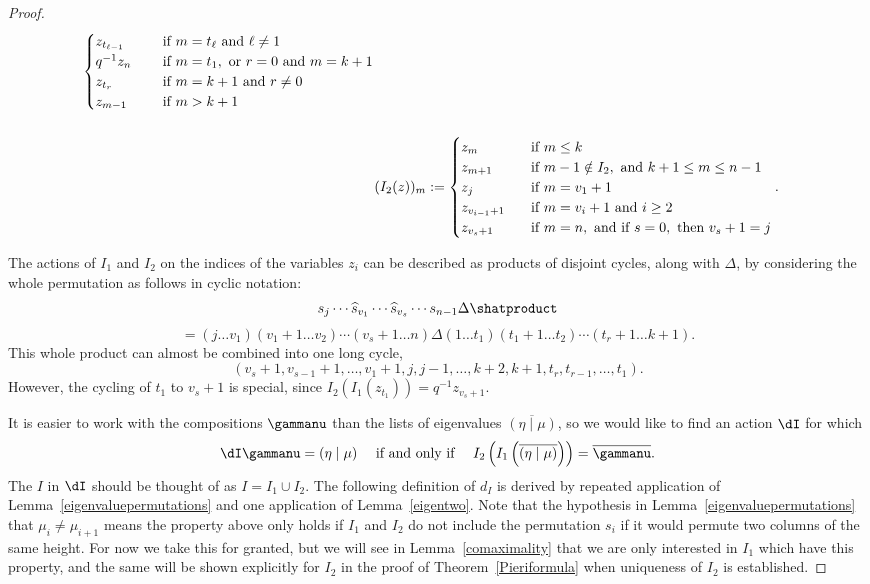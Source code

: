\begin{proof}
\begin{align}
\begin{cases}
z_{t_{\ell-1}} \hspace*{.5cm} &\text{ if } m=t_\ell \text{ and } \ell \neq 1\\
q^{-1} z_n &\text{ if } m=t_1, \text{ or } r=0 \text{ and }m=k+1 \\
z_{t_r} &\text{ if } m=k+1 \text{ and } r\neq 0\\
z_{m-1} &\text{ if } m > k+1 \end{cases}\\[5mm]
\label{Itwo}& (I_2(z))_m := \begin{cases} z_m  &\text{ if } m\leq k \\
z_{m+1} \hspace*{.5cm} &\text{ if } m-1 \notin I_2, \text{ and } k+1 \leq m \leq n-1\\
z_{j} &\text{ if } m=v_1+1\\
z_{v_{i-1}+1} &\text{ if } m=v_i+1 \text{ and } i \geq 2\\
z_{v_s +1} &\text{ if } m=n, \text{ and if } s=0, \text{ then } v_s+1=j \end{cases}.\end{align}




The actions of $I_1$ and $I_2$ on the indices of the variables $z_i$ can be described as products of disjoint cycles, along with $\Delta$, by considering the whole permutation as follows in cyclic notation:
\[ s_j \dotsm \widehat{s}_{v_1} \dotsm \widehat{s}_{v_s} \dotsm s_{n-1}\Delta \shatproduct \]
\[ = (j \dots v_1) (v_1+1 \dots v_2) \dotsm (v_s+1 \dots n) \Delta (1 \dots t_1) (t_1+1 \dots t_2) \dotsm (t_r+1 \dots k+1).\]
This whole product can almost be combined into one long cycle,
\[ (v_s+1, v_{s-1}+1, \dots, v_1+1, j, j-1, \dots, k+2, k+1, t_r, t_{r-1}, \dots, t_1).\]
However, the cycling of $t_1$ to $v_s+1$ is special, since $I_2(I_1(z_{t_1})) = q^{-1} z_{v_s+1}$.

It is easier to work with the compositions $\gammanu$ than the lists of eigenvalues $\overline{(\eta \mid \mu)}$, so we would like to find an action $\dI$ for which 
\[\dI \gammanu=(\eta \mid \mu) \quad \text{ if and only if } \quad  I_2\left(I_1\left(\overline{(\eta \mid \mu)}\right) \right) = \overline{\gammanu}.\] The $I$ in $\dI$ should be thought of as $I = I_1 \cup I_2$. The following definition of $d_I$ is derived by repeated application of Lemma~\ref{eigenvaluepermutations} and one application of Lemma~\ref{eigentwo}. Note that the hypothesis in Lemma~\ref{eigenvaluepermutations} that $\mu_i \neq \mu_{i+1}$ means the property above only holds if $I_1$ and $I_2$ do not include the permutation $s_i$ if it would permute two columns of the same height. For now we take this for granted, but we will see in Lemma~\ref{comaximality} that we are only interested in $I_1$ which have this property, and the same will be shown explicitly for $I_2$ in the proof of Theorem~\ref{Pieriformula} when uniqueness of $I_2$ is established.


\end{proof}
